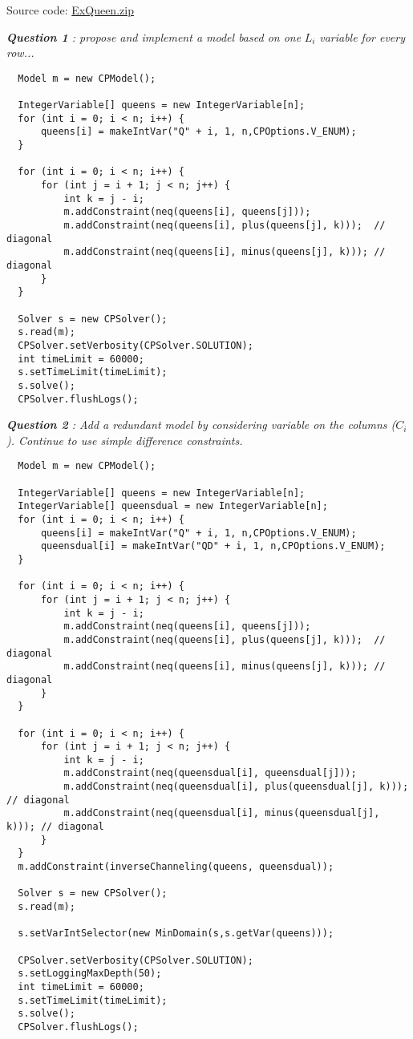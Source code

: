 Source code: \href{media/zip/exqueen.zip}{ExQueen.zip}

\noindent\emph{\textbf{Question 1} : propose and implement a model based on one} $L_{i}$ \emph{variable for every row...}
\begin{lstlisting}
  Model m = new CPModel();
  
  IntegerVariable[] queens = new IntegerVariable[n];
  for (int i = 0; i < n; i++) {
      queens[i] = makeIntVar("Q" + i, 1, n,CPOptions.V_ENUM);
  }
	
  for (int i = 0; i < n; i++) {
      for (int j = i + 1; j < n; j++) {
          int k = j - i;
          m.addConstraint(neq(queens[i], queens[j]));
          m.addConstraint(neq(queens[i], plus(queens[j], k)));  // diagonal
          m.addConstraint(neq(queens[i], minus(queens[j], k))); // diagonal
      }
  }
	
  Solver s = new CPSolver();
  s.read(m);
  CPSolver.setVerbosity(CPSolver.SOLUTION);
  int timeLimit = 60000;
  s.setTimeLimit(timeLimit);
  s.solve();
  CPSolver.flushLogs();
\end{lstlisting}

\noindent\emph{\textbf{Question 2} : Add a redundant model by considering variable on the columns ($C_i$). Continue to use simple difference constraints.}

\begin{lstlisting}
  Model m = new CPModel();
	
  IntegerVariable[] queens = new IntegerVariable[n];
  IntegerVariable[] queensdual = new IntegerVariable[n];
  for (int i = 0; i < n; i++) {
      queens[i] = makeIntVar("Q" + i, 1, n,CPOptions.V_ENUM);
      queensdual[i] = makeIntVar("QD" + i, 1, n,CPOptions.V_ENUM);
  }
	
  for (int i = 0; i < n; i++) {
      for (int j = i + 1; j < n; j++) {
          int k = j - i;
          m.addConstraint(neq(queens[i], queens[j]));
          m.addConstraint(neq(queens[i], plus(queens[j], k)));  // diagonal
          m.addConstraint(neq(queens[i], minus(queens[j], k))); // diagonal
      }
  }

  for (int i = 0; i < n; i++) {
      for (int j = i + 1; j < n; j++) {
          int k = j - i;
          m.addConstraint(neq(queensdual[i], queensdual[j]));
          m.addConstraint(neq(queensdual[i], plus(queensdual[j], k)));  // diagonal
          m.addConstraint(neq(queensdual[i], minus(queensdual[j], k))); // diagonal
      }
  }
  m.addConstraint(inverseChanneling(queens, queensdual));
  
  Solver s = new CPSolver();
  s.read(m);
  
  s.setVarIntSelector(new MinDomain(s,s.getVar(queens)));
  
  CPSolver.setVerbosity(CPSolver.SOLUTION);
  s.setLoggingMaxDepth(50);
  int timeLimit = 60000;
  s.setTimeLimit(timeLimit);
  s.solve();
  CPSolver.flushLogs();
\end{lstlisting}

